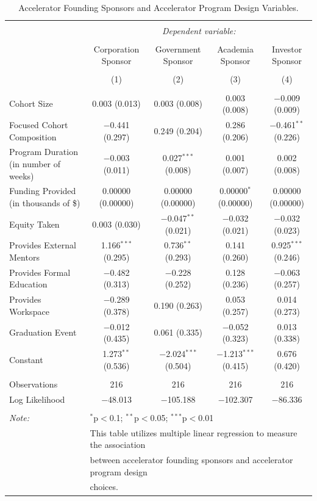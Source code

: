 \documentclass[
  12pt,
]{article}
\begin{document}
~

\onehalfspacing

\begin{table}[H] \centering 
  \caption{Accelerator Founding Sponsors and Accelerator Program Design Variables.} 
  \label{tab:accsponaccdesign} 
\scriptsize 
\begin{tabular}{@{\extracolsep{1pt}}lcccc} 
\\[-1.8ex]\hline 
\hline \\[-1.8ex] 
 & \multicolumn{4}{c}{\textit{Dependent variable:}} \\ 
\cline{2-5} 
\\[-1.8ex] & Corporation Sponsor & Government Sponsor & Academia Sponsor & Investor Sponsor \\ 
\\[-1.8ex] & (1) & (2) & (3) & (4)\\ 
\hline \\[-1.8ex] 
 Cohort Size & 0.003 (0.013) & 0.003 (0.008) & 0.003 (0.008) & $-$0.009 (0.009) \\ 
  Focused Cohort Composition & $-$0.441 (0.297) & 0.249 (0.204) & 0.286 (0.206) & $-$0.461$^{**}$ (0.226) \\ 
  Program Duration (in number of weeks) & $-$0.003 (0.011) & 0.027$^{***}$ (0.008) & 0.001 (0.007) & 0.002 (0.008) \\ 
  Funding Provided (in thousands of \$) & 0.00000 (0.00000) & 0.00000 (0.00000) & 0.00000$^{*}$ (0.00000) & 0.00000 (0.00000) \\ 
  Equity Taken & 0.003 (0.030) & $-$0.047$^{**}$ (0.021) & $-$0.032 (0.021) & $-$0.032 (0.023) \\ 
  Provides External Mentors & 1.166$^{***}$ (0.295) & 0.736$^{**}$ (0.293) & 0.141 (0.260) & 0.925$^{***}$ (0.246) \\ 
  Provides Formal Education & $-$0.482 (0.313) & $-$0.228 (0.252) & 0.128 (0.236) & $-$0.063 (0.257) \\ 
  Provides Workspace & $-$0.289 (0.378) & 0.190 (0.263) & 0.053 (0.257) & 0.014 (0.273) \\ 
  Graduation Event & $-$0.012 (0.435) & 0.061 (0.335) & $-$0.052 (0.323) & 0.013 (0.338) \\ 
  Constant & 1.273$^{**}$ (0.536) & $-$2.024$^{***}$ (0.504) & $-$1.213$^{***}$ (0.415) & 0.676 (0.420) \\ 
 \hline \\[-1.8ex] 
Observations & 216 & 216 & 216 & 216 \\ 
Log Likelihood & $-$48.013 & $-$105.188 & $-$102.307 & $-$86.336 \\ 
\hline 
\hline \\[-1.8ex] 
\textit{Note:}  & \multicolumn{4}{l}{$^{*}$p$<$0.1; $^{**}$p$<$0.05; $^{***}$p$<$0.01} \\ 
 & \multicolumn{4}{l}{This table utilizes multiple linear regression to measure the association } \\ 
 & \multicolumn{4}{l}{between accelerator founding sponsors and accelerator program design } \\ 
 & \multicolumn{4}{l}{choices.} \\ 
\end{tabular} 
\end{table}
\end{document}
